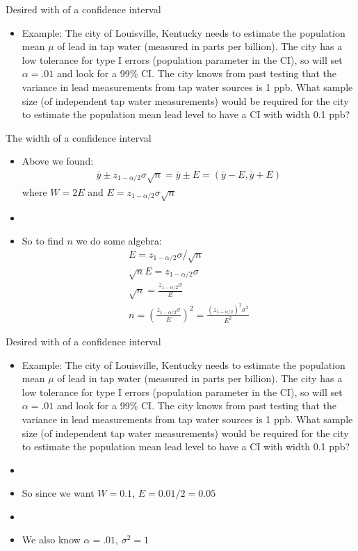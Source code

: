 \documentclass[xcolor=dvipsnames]{beamer}
\begin{document}
\begin{frame}{Desired with of a confidence interval}
	\begin{itemize}
		\item Example: The city of Louisville, Kentucky needs to estimate the population mean $\mu$ of lead in tap water (measured in parts per billion). The city has a low tolerance for type I errors (population parameter in the CI), so will set $\alpha = .01$ and look for a 99\% CI. The city knows from past testing that the variance in lead measurements from tap water sources is 1 ppb. What sample size (of independent tap water measurements) would be required for the city to estimate the population mean lead level to have a CI with width 0.1 ppb?
	\end{itemize}
\end{frame}

\begin{frame}{The width of a confidence interval}
\begin{itemize}
	\item Above we found:
	\begin{align*}
	\bar{y}\pm z_{1-\alpha/2} \sigma \sqrt{n} = \bar{y} \pm E = (\bar{y}-E, \bar{y}+E)
	\end{align*}
	where $W = 2E$ and $E = z_{1-\alpha/2} \sigma \sqrt{n}$
	\item[]
	\item So to find $n$ we do some algebra:
	\begin{gather*}
		E = z_{1-\alpha/2} \sigma / \sqrt{n} \\
		\sqrt{n} E = z_{1-\alpha/2} \sigma  \\
		\sqrt{n} = \frac{z_{1-\alpha/2} \sigma}{E} \\
		n = \left(\frac{z_{1-\alpha/2} \sigma}{E}\right)^2 = \frac{(z_{1-\alpha/2})^2 \sigma^2}{E^2}
	\end{gather*}
\end{itemize}
\end{frame}

\begin{frame}{Desired with of a confidence interval}
		\begin{itemize}
		\item Example: The city of Louisville, Kentucky needs to estimate the population mean $\mu$ of lead in tap water (measured in parts per billion). The city has a low tolerance for type I errors (population parameter in the CI), so will set $\alpha = .01$ and look for a 99\% CI. The city knows from past testing that the variance in lead measurements from tap water sources is 1 ppb. What sample size (of independent tap water measurements) would be required for the city to estimate the population mean lead level to have a CI with width 0.1 ppb?
		\item[]
		\item So since we want $W = 0.1$, $E = 0.01/2 = 0.05$
		\item[]
		\item We also know $\alpha = .01$, $\sigma^2 = 1$
	\end{itemize}
\end{frame}
\end{document}
